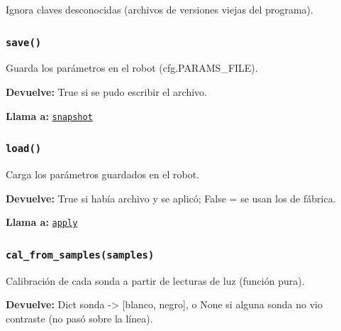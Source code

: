 Ignora claves desconocidas (archivos de versiones viejas del programa).

\par{}\par\smallskip

\subsubsection{\texttt{save()}}\label{fn:settings:save}
\noindent Guarda los parámetros en el robot (cfg.PARAMS\_FILE).

\noindent\textbf{Devuelve:} True si se pudo escribir el archivo.\par
\noindent\textbf{Llama a:} \hyperref[fn:settings:snapshot]{\texttt{snapshot}}\par

\subsubsection{\texttt{load()}}\label{fn:settings:load}
\noindent Carga los parámetros guardados en el robot.

\noindent\textbf{Devuelve:} True si había archivo y se aplicó; False = se usan los de fábrica.\par
\noindent\textbf{Llama a:} \hyperref[fn:settings:apply]{\texttt{apply}}\par

\subsubsection{\texttt{cal\_\allowbreak{}from\_\allowbreak{}samples(samples)}}\label{fn:settings:cal-from-samples}
\noindent Calibración de cada sonda a partir de lecturas de luz (función pura).

\par{}\par\smallskip
\noindent\textbf{Devuelve:} Dict sonda -> [blanco, negro], o None si alguna sonda no vio contraste (no pasó sobre la línea).\par

